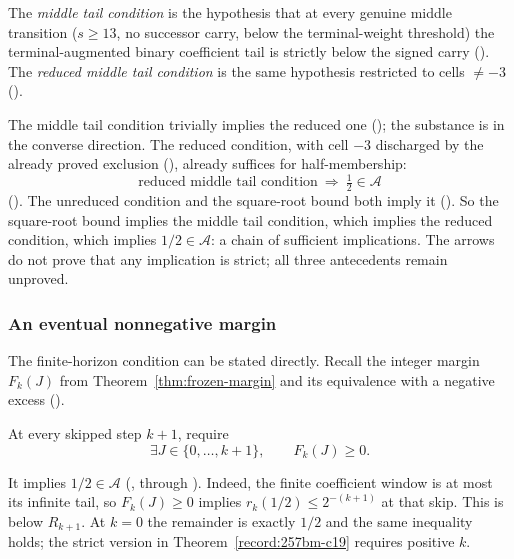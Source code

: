 \begin{defn}
The \emph{middle tail condition} is the hypothesis that at every genuine middle
transition ($s\ge13$, no successor carry, below the terminal-weight threshold) the terminal-augmented
binary coefficient tail is strictly below the signed carry
().
The \emph{reduced middle tail condition} is the same hypothesis restricted to cells
$\ne-3$ ().
\end{defn}
The middle tail condition trivially implies the reduced one
();
the substance is in the converse direction. The reduced condition, with cell
$-3$ discharged by the already proved exclusion
(),
already suffices for half-membership:
\[
\text{reduced middle tail condition}\ \Longrightarrow\ \tfrac12\in\mathcal{A}
\]
().
The unreduced condition and the square-root bound both imply it
().
So the square-root bound implies the middle tail condition, which implies the reduced
condition, which implies $1/2\in\mathcal A$: a chain of sufficient implications.  The
arrows do not prove that any implication is strict; all three antecedents remain unproved.

\subsubsection{An eventual nonnegative margin}

The finite-horizon condition can be stated directly.  Recall the integer
margin $F_k(J)$ from Theorem~\ref{thm:frozen-margin} and its equivalence with a
negative excess
().

\begin{defn}
At every skipped step $k+1$, require
\[
 \exists J\in\{0,\ldots,k+1\},\qquad F_k(J)\ge0.
\]
\par\noindent
{}
\end{defn}
It implies $1/2\in\mathcal A$
(,
through
).
Indeed, the finite coefficient window is at most its
infinite tail, so $F_k(J)\ge0$ implies
$r_k(1/2)\le2^{-(k+1)}$ at that skip.  This is below $R_{k+1}$.
At $k=0$ the remainder is exactly $1/2$ and the same inequality
holds; the strict version in Theorem~\ref{record:257bm-c19}
requires positive $k$.

